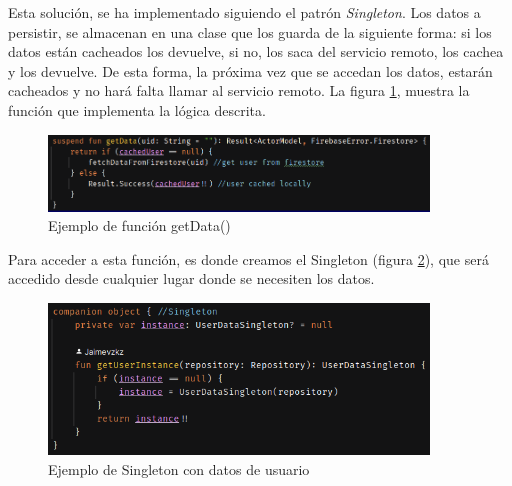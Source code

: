 Esta solución, se ha implementado siguiendo el patrón \textit{Singleton}. Los datos a persistir, se almacenan en una clase que los guarda de la siguiente forma: si los datos están cacheados los devuelve, si no, los saca del servicio remoto, los cachea y los devuelve. De esta forma, la próxima vez que se accedan los datos, estarán cacheados y no hará falta llamar al servicio remoto. La figura \ref{fig:ejemplo_singleton1}, muestra la función que implementa la lógica descrita.

\begin{figure}[h]
    \centering
    \includegraphics[width = 0.9\textwidth]{Imagenes/Fuentes/ejemplo_singleton1.png}
    \caption{Ejemplo de función getData()}
    \label{fig:ejemplo_singleton1}
\end{figure}

Para acceder a esta función, es donde creamos el Singleton (figura \ref{fig:ejemplo_singleton2}), que será accedido desde cualquier lugar donde se necesiten los datos.
\begin{figure}[h]
    \centering
    \includegraphics[width = 0.9\textwidth]{Imagenes/Fuentes/ejemplo_singleton2.png}
    \caption{Ejemplo de Singleton con datos de usuario}
    \label{fig:ejemplo_singleton2}
\end{figure}